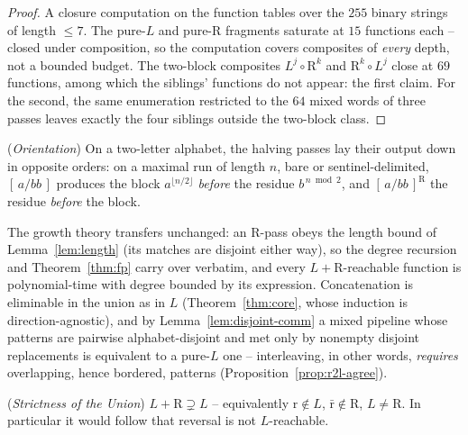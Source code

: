 \documentclass[runningheads,envcountsect]{llncs}
\begin{document}
\begin{proof}
    A closure computation on the function tables over the $255$ binary strings of length $\leq 7$. The pure-$L$ and pure-$\mathrm{R}$ fragments saturate at $15$ functions each -- closed under composition, so the computation covers composites of \emph{every} depth, not a bounded budget. The two-block composites $L^j \circ \mathrm{R}^k$ and $\mathrm{R}^k \circ L^j$ close at $69$ functions, among which the siblings' functions do not appear: the first claim. For the second, the same enumeration restricted to the $64$ mixed words of three passes leaves exactly the four siblings outside the two-block class.
\end{proof}

\begin{lemma}
    (\emph{Orientation})
    \label{lem:orientation}
    On a two-letter alphabet, the halving passes lay their output down in opposite orders: on a maximal run of length $n$, bare or sentinel-delimited, $[\,a/bb\,]$ produces the block $a^{\lfloor n/2 \rfloor}$ \emph{before} the residue $b^{\,n \bmod 2}$, and $[\,a/bb\,]^{\mathrm{R}}$ the residue \emph{before} the block.
\end{lemma}

The growth theory transfers unchanged: an $\mathrm{R}$-pass obeys the length bound of Lemma~\ref{lem:length} (its matches are disjoint either way), so the degree recursion and Theorem~\ref{thm:fp} carry over verbatim, and every $L{+}\mathrm{R}$-reachable function is polynomial-time with degree bounded by its expression. Concatenation is eliminable in the union as in $L$ (Theorem~\ref{thm:core}, whose induction is direction-agnostic), and by Lemma~\ref{lem:disjoint-comm} a mixed pipeline whose patterns are pairwise alphabet-disjoint and met only by nonempty disjoint replacements is equivalent to a pure-$L$ one -- interleaving, in other words, \emph{requires} overlapping, hence bordered, patterns (Proposition~\ref{prop:r2l-agree}).

\begin{conjecture}
    (\emph{Strictness of the Union})
    \label{conj:union}
    $L{+}\mathrm{R} \supsetneq L$ -- equivalently $\mathrm{r} \notin L$, $\bar{\mathrm{r}} \notin \mathrm{R}$, $L \neq \mathrm{R}$. In particular it would follow that reversal is not $L$-reachable.
\end{conjecture}
\end{document}
